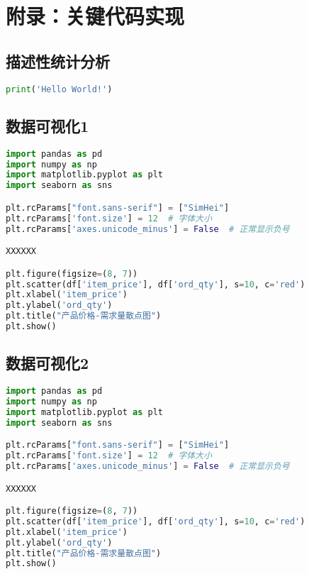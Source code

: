 

\appendix  %




\section{附录：关键代码实现}

\subsection{描述性统计分析}


\begin{lstlisting}[language=Python]
print('Hello World!')
\end{lstlisting}



\subsection{数据可视化1}


\begin{lstlisting}[language=Python]
import pandas as pd
import numpy as np
import matplotlib.pyplot as plt
import seaborn as sns

plt.rcParams["font.sans-serif"] = ["SimHei"]
plt.rcParams['font.size'] = 12  # 字体大小
plt.rcParams['axes.unicode_minus'] = False  # 正常显示负号

XXXXXX

plt.figure(figsize=(8, 7))
plt.scatter(df['item_price'], df['ord_qty'], s=10, c='red')
plt.xlabel('item_price')
plt.ylabel('ord_qty')
plt.title("产品价格-需求量散点图")
plt.show()
\end{lstlisting}


\subsection{数据可视化2}


\begin{lstlisting}[language=Python]
import pandas as pd
import numpy as np
import matplotlib.pyplot as plt
import seaborn as sns

plt.rcParams["font.sans-serif"] = ["SimHei"]
plt.rcParams['font.size'] = 12  # 字体大小
plt.rcParams['axes.unicode_minus'] = False  # 正常显示负号

XXXXXX

plt.figure(figsize=(8, 7))
plt.scatter(df['item_price'], df['ord_qty'], s=10, c='red')
plt.xlabel('item_price')
plt.ylabel('ord_qty')
plt.title("产品价格-需求量散点图")
plt.show()
\end{lstlisting}



